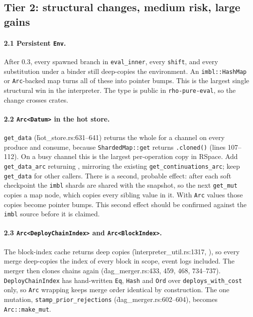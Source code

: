 \documentclass[11pt]{article}
\begin{document}
\subsection{Tier 2: structural changes, medium risk, large gains}

\paragraph{2.1 Persistent \texttt{Env}.} After 0.3, every spawned branch in \texttt{eval\_inner},
every \texttt{shift}, and every substitution under a binder still deep-copies the environment.
An \texttt{imbl::HashMap} or \texttt{Arc}-backed map turns all of these into pointer bumps. This
is the largest single structural win in the interpreter. The type is public in
\texttt{rho-pure-eval}, so the change crosses crates.

\paragraph{2.2 \texttt{Arc<Datum>} in the hot store.} \texttt{get\_data}
(\f{hot_store.rs}:631--641) returns the whole  for a channel on every
produce and consume, because \texttt{ShardedMap::get} returns \texttt{.cloned()}
(lines 107--112). On a busy channel this is the largest per-operation copy in RSpace. Add
\texttt{get\_data\_arc} returning , mirroring the existing
\texttt{get\_continuations\_arc}; keep \texttt{get\_data} for other callers. There is a second,
probable effect: after each soft checkpoint the \texttt{imbl} shards are shared with the
snapshot, so the next \texttt{get\_mut} copies a map node, which copies every sibling value in
it. With \texttt{Arc} values those copies become pointer bumps. This second effect should be
confirmed against the \texttt{imbl} source before it is claimed.

\paragraph{2.3 \texttt{Arc<DeployChainIndex>} and \texttt{Arc<BlockIndex>}.} The block-index
cache returns deep copies (\f{interpreter_util.rs}:1317, ), so
every merge deep-copies the index of every block in scope, event logs included. The merger then
clones chains again (\f{dag_merger.rs}:433, 459, 468, 734--737). \texttt{DeployChainIndex} has
hand-written \texttt{Eq}, \texttt{Hash} and \texttt{Ord} over \texttt{deploys\_with\_cost} only,
so \texttt{Arc} wrapping keeps merge order identical by construction. The one mutation,
\texttt{stamp\_prior\_rejections} (\f{dag_merger.rs}:602--604), becomes \texttt{Arc::make\_mut}.
\end{document}
